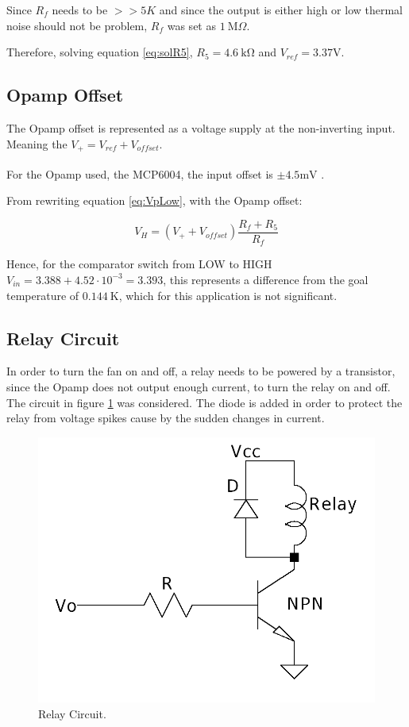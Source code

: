 Since $R_f$ needs to be $>>5K$ and since the output is either high or low thermal noise should not be problem, $R_f$ was set as $\SI{1}{\mega\Omega}$. 

Therefore, solving equation \ref{eq:solR5}, $R_5 = \SI{4.6}{\kilo\ohm}$ and $V_{ref} = 3.37\si{\V}$.
\subsection{Opamp Offset}

The Opamp offset is represented as a voltage supply at the non-inverting input. Meaning the  $V_{+} = V_{ref} + V_{offset}$.

For the Opamp used, the MCP6004, the input offset is $\pm 4.5\si{\milli\volt}$ \textsuperscript{\cite{MCP6001_datasheet}}. 

From rewriting equation \ref{eq:VpLow}, with the Opamp offset:

\begin{equation}
    V_H = \left ( V_+ + V_{offset}\right )\frac{R_f +R_5}{R_f}
\end{equation}
 
Hence, for the comparator switch from LOW to HIGH $V_{in} = 3.388 + 4.52\cdot 10^{-3} = 3.393$, this represents a difference from the goal temperature of $\SI{0.144}{\kelvin}$, which for this application is not significant.

\subsection{Relay Circuit}
In order to turn the fan on and off, a relay needs to be powered by a transistor, since the Opamp does not output enough current, to turn the relay on and off. The circuit in figure \ref{fig:RelayCirc} was considered. The diode is added in order to protect the relay from voltage spikes cause by the sudden changes in current.

\begin{figure}[H]
    \centering
    \includegraphics*[scale = 0.2]{Images/RelayCirc.png}
    \caption{Relay Circuit.}
    \label{fig:RelayCirc}
\end{figure}

